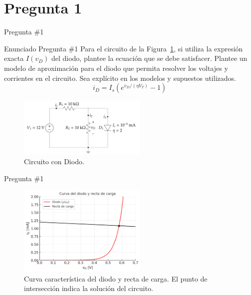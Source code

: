 \documentclass[
    10pt,
    aspectratio=169,
    xcolor={dvipsnames},
    spanish,
    ]{beamer}
\begin{document}
\section{Pregunta 1}
\begin{frame}{Pregunta \#1}
  \footnotesize
  \begin{block}{Enunciado Pregunta \#1}
    Para el circuito de la Figura~\ref{fig:1}, si utiliza la expresión exacta $I(v_D)$ del diodo, plantee la ecuación que se debe satisfacer. Plantee un modelo de aproximación para el diodo que permita resolver los voltajes y corrientes en el circuito. Sea explícito en los modelos y supuestos utilizados.
\begin{equation}
  i_D = I_s \left( e^{v_D/(\eta V_T)} - 1 \right)
\end{equation}
\end{block}
\begin{figure}[H]
    \centering
    \includegraphics[width=0.55\textwidth]{Auxiliar_4_1}
  \caption{Circuito con Diodo.}
    \label{fig:1}
\end{figure}
\end{frame}
\begin{frame}{Pregunta \#1}
  \begin{figure}[H]
    \centering
    \includegraphics[width=0.55\textwidth]{Auxiliar_4_2}
    \caption{Curva característica del diodo y recta de carga. El punto de intersección indica la solución del circuito.}
    \label{fig:2}
\end{figure}
\end{frame}
\end{document}
